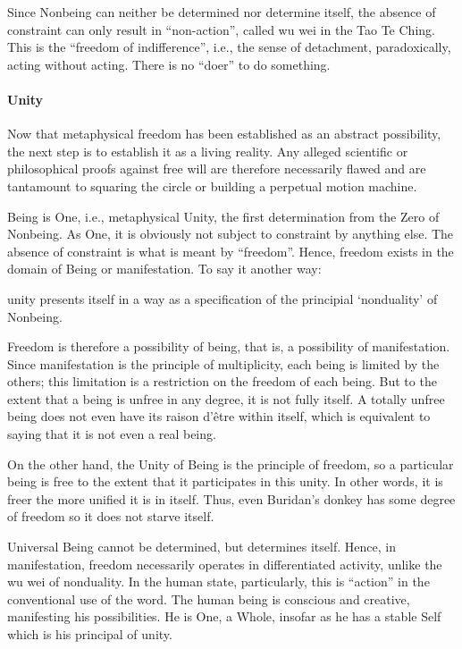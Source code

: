Since Nonbeing can neither be determined nor determine itself, the absence of constraint can only result in “non-action”, called wu wei in the Tao Te Ching. This is the “freedom of indifference”, i.e., the sense of detachment, paradoxically, acting without acting. There is no “doer” to do something.

\paragraph{Unity}
Now that metaphysical freedom has been established as an abstract possibility, the next step is to establish it as a living reality. Any alleged scientific or philosophical proofs against free will are therefore necessarily flawed and are tantamount to squaring the circle or building a perpetual motion machine.

Being is One, i.e., metaphysical Unity, the first determination from the Zero of Nonbeing. As One, it is obviously not subject to constraint by anything else. The absence of constraint is what is meant by “freedom”. Hence, freedom exists in the domain of Being or manifestation. To say it another way:

\begin{quotex}
unity presents itself in a way as a specification of the principial ‘nonduality' of Nonbeing.

\end{quotex}
Freedom is therefore a possibility of being, that is, a possibility of manifestation. Since manifestation is the principle of multiplicity, each being is limited by the others; this limitation is a restriction on the freedom of each being. But to the extent that a being is unfree in any degree, it is not fully itself. A totally unfree being does not even have its raison d’être within itself, which is equivalent to saying that it is not even a real being.

On the other hand, the Unity of Being is the principle of freedom, so a particular being is free to the extent that it participates in this unity. In other words, it is freer the more unified it is in itself. Thus, even Buridan's donkey has some degree of freedom so it does not starve itself.

Universal Being cannot be determined, but determines itself. Hence, in manifestation, freedom necessarily operates in differentiated activity, unlike the wu wei of nonduality. In the human state, particularly, this is “action” in the conventional use of the word. The human being is conscious and creative, manifesting his possibilities. He is One, a Whole, insofar as he has a stable Self which is his principal of unity.

